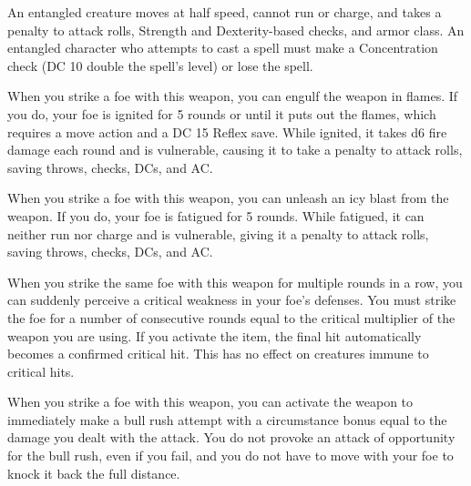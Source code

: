 An entangled creature moves at half speed, cannot run or charge, and takes a  penalty to attack rolls, Strength and Dexterity-based checks, and armor class. An entangled character who attempts to cast a spell must make a Concentration check (DC 10 \add double the spell's level) or lose the spell.


 When you strike a foe with this weapon, you can engulf the weapon in flames. If you do, your foe is ignited for 5 rounds or until it puts out the flames, which requires a move action and a DC 15 Reflex save. While ignited, it takes d6 fire damage each round and is vulnerable, causing it to take a  penalty to attack rolls, saving throws, checks, DCs, and AC.


 When you strike a foe with this weapon, you can unleash an icy blast from the weapon. If you do, your foe is fatigued for 5 rounds. While fatigued, it can neither run nor charge and is vulnerable, giving it a  penalty to attack rolls, saving throws, checks, DCs, and AC.


 When you strike the same foe with this weapon for multiple rounds in a row, you can suddenly perceive a critical weakness in your foe's defenses. You must strike the foe for a number of consecutive rounds equal to the critical multiplier of the weapon you are using. If you activate the item, the final hit automatically becomes a confirmed critical hit. This has no effect on creatures immune to critical hits.


 When you strike a foe with this weapon, you can activate the weapon to immediately make a bull rush attempt with a circumstance bonus equal to the damage you dealt with the attack. You do not provoke an attack of opportunity for the bull rush, even if you fail, and you do not have to move with your foe to knock it back the full distance.

